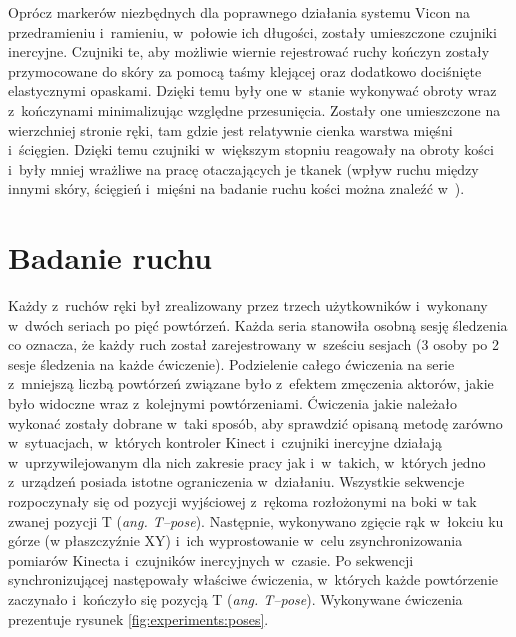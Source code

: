Oprócz markerów niezbędnych dla poprawnego działania systemu Vicon na przedramieniu i~ramieniu, w~połowie ich długości, zostały umieszczone czujniki inercyjne. Czujniki te, aby możliwie wiernie rejestrować ruchy kończyn zostały przymocowane do skóry za pomocą taśmy klejącej oraz dodatkowo dociśnięte elastycznymi opaskami. Dzięki temu były one w~stanie wykonywać obroty wraz z~kończynami minimalizując względne przesunięcia. Zostały one umieszczone na wierzchniej stronie ręki, tam gdzie jest relatywnie cienka warstwa mięśni i~ścięgien. Dzięki temu czujniki w~większym stopniu reagowały na obroty kości i~były mniej wrażliwe na pracę otaczających je tkanek (wpływ ruchu między innymi skóry, ścięgień i~mięśni na badanie ruchu kości można znaleźć w~\cite{Sati2016,Reinschmidt2016}).
				
\section{Badanie ruchu}
				
Każdy z~ruchów ręki był zrealizowany przez trzech użytkowników i~wykonany w~dwóch seriach po pięć powtórzeń. Każda seria stanowiła osobną sesję śledzenia co oznacza, że każdy ruch został zarejestrowany w~sześciu sesjach (3 osoby po 2 sesje śledzenia na każde ćwiczenie). Podzielenie całego ćwiczenia na serie z~mniejszą liczbą powtórzeń związane było z~efektem zmęczenia aktorów, jakie było widoczne wraz z~kolejnymi powtórzeniami. Ćwiczenia jakie należało wykonać zostały dobrane w~taki sposób, aby sprawdzić opisaną metodę zarówno w~sytuacjach, w~których kontroler Kinect i~czujniki inercyjne działają w~uprzywilejowanym dla nich zakresie pracy jak i~w~takich, w~których jedno z~urządzeń posiada istotne ograniczenia w~działaniu. Wszystkie sekwencje rozpoczynały się od pozycji wyjściowej z~rękoma rozłożonymi na boki w tak zwanej pozycji T (\emph{ang. T--pose}). Następnie, wykonywano zgięcie rąk w~łokciu ku górze (w płaszczyźnie XY) i~ich wyprostowanie w~celu zsynchronizowania pomiarów Kinecta i~czujników inercyjnych w~czasie. Po sekwencji synchronizującej następowały właściwe ćwiczenia, w~których każde powtórzenie zaczynało i~kończyło się pozycją T (\emph{ang. T--pose}). Wykonywane ćwiczenia prezentuje rysunek \ref{fig:experiments:poses}.
			
